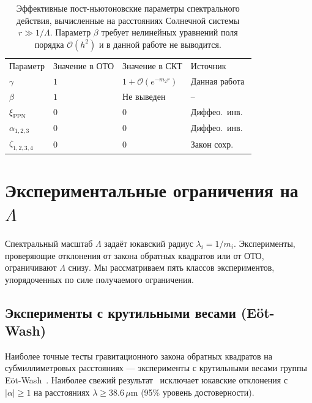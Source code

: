 \documentclass[aps,prd,twocolumn,superscriptaddress,nofootinbib,floatfix]{revtex4-2}
\newcommand{\order}{\mathcal{O}}
\begin{document}
\begin{table}[t]
\caption{Эффективные пост-ньютоновские параметры спектрального
действия, вычисленные на расстояниях Солнечной системы
$r \gg 1/\Lambda$. Параметр $\beta$ требует нелинейных уравнений
поля порядка $\order(h^2)$ и в данной работе не выводится.}
\label{tab:ppn}
\begin{ruledtabular}
\begin{tabular}{llll}
Параметр & Значение в ОТО & Значение в СКТ & Источник \\
\colrule
$\gamma$ & $1$ & $1 + \order(e^{-m_2 r})$ & Данная работа \\
$\beta$ & $1$ & Не выведен & -- \\
$\xi_\mathrm{PPN}$ & $0$ & $0$ & Диффео.\ инв.\ \\
$\alpha_{1,2,3}$ & $0$ & $0$ & Диффео.\ инв.\ \\
$\zeta_{1,2,3,4}$ & $0$ & $0$ & Закон сохр.\ \\
\end{tabular}
\end{ruledtabular}
\end{table}


\section{Экспериментальные ограничения на \texorpdfstring{$\Lambda$}{Lambda}}
\label{sec:bounds}

Спектральный масштаб $\Lambda$ задаёт юкавский радиус
$\lambda_i = 1/m_i$. Эксперименты, проверяющие отклонения от закона
обратных квадратов или от ОТО, ограничивают $\Lambda$ снизу. Мы
рассматриваем пять классов экспериментов, упорядоченных по силе
получаемого ограничения.

\subsection{Эксперименты с крутильными весами (E\"ot-Wash)}

Наиболее точные тесты гравитационного закона обратных квадратов на
субмиллиметровых расстояниях --- эксперименты с крутильными весами
группы E\"ot-Wash~\cite{Lee:2020,Kapner:2007,Adelberger:2009}.
Наиболее свежий результат~\cite{Lee:2020} исключает юкавские
отклонения с $|\alpha| \geq 1$ на расстояниях
$\lambda \geq 38.6\,\mu\mathrm{m}$ (95\% уровень достоверности).
\end{document}
